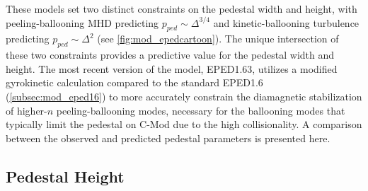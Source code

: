 \begin{figure}[h]
 \pushtooutside
\end{figure}

\noindent These models set two distinct constraints on the pedestal width and height, with peeling-ballooning MHD predicting $p_{ped} \sim \Delta^{3/4}$ and kinetic-ballooning turbulence predicting $p_{ped} \sim \Delta^2$ (see \cref{fig:mod_epedcartoon}).  The unique intersection of these two constraints provides a predictive value for the pedestal width and height.  The most recent version of the model, EPED1.63, utilizes a modified gyrokinetic calculation compared to the standard EPED1.6 (\cref{subsec:mod_eped16}) to more accurately constrain the diamagnetic stabilization of higher-$n$ peeling-ballooning modes, necessary for the ballooning modes that typically limit the pedestal on C-Mod due to the high collisionality.  A comparison between the observed and predicted pedestal parameters is presented here.

\subsection{Pedestal Height}\label{subsec:elmy_eped_height}

